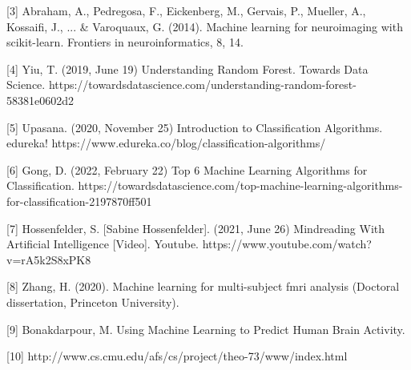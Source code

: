 \documentclass{article}
\begin{document}
[3] Abraham, A., Pedregosa, F., Eickenberg, M., Gervais, P., Mueller, A., Kossaifi, J., ... \& Varoquaux, G. (2014). Machine learning for neuroimaging with scikit-learn. 
Frontiers in neuroinformatics, 8, 14.

[4] Yiu, T. (2019, June 19) Understanding Random Forest. Towards Data Science. https://towardsdatascience.com/understanding-random-forest-58381e0602d2

[5] Upasana. (2020, November 25) Introduction to Classification Algorithms. edureka! https://www.edureka.co/blog/classification-algorithms/

[6] Gong, D. (2022, February 22) Top 6 Machine Learning Algorithms for Classification. https://towardsdatascience.com/top-machine-learning-algorithms-for-classification-2197870ff501

[7] Hossenfelder,  S. [Sabine Hossenfelder]. (2021, June 26) Mindreading With Artificial Intelligence [Video]. Youtube. https://www.youtube.com/watch?v=rA5k2S8xPK8

[8] Zhang, H. (2020). Machine learning for multi-subject fmri analysis (Doctoral dissertation, Princeton University).

[9] Bonakdarpour, M. Using Machine Learning to Predict Human Brain Activity.

[10] http://www.cs.cmu.edu/afs/cs/project/theo-73/www/index.html
\end{document}
